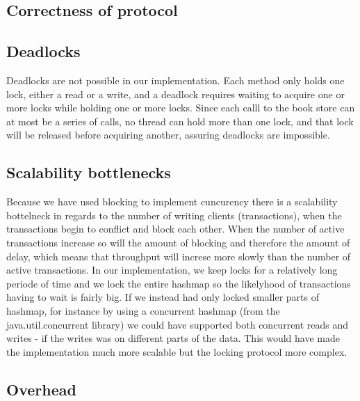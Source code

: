 \documentclass{article}
\theoremstyle{plain}
\theoremstyle{nonumberplain}
\begin{document}
\subsection{Correctness of protocol}



\subsection{Deadlocks}

Deadlocks are not possible in our implementation. Each method only holds one lock, either a read or a write, and a deadlock requires waiting to acquire one or more locks while holding one or more locks. Since each calll to the book store can at most be a series of calls, no thread can hold more than one lock, and that lock will be released before acquiring another, assuring deadlocks are impossible.

\subsection{Scalability bottlenecks}
Because we have used blocking to implement cuncurency there is a scalability bottelneck in regards to the number of writing clients (transactions), when the transactions begin to conflict and block each other. 
When the number of active transactions increase so will the amount of blocking and therefore the amount of delay, which means that throughput will increse more slowly than the number of active transactions. 
In our implementation, we keep locks for a relatively long periode of time and we lock the entire hashmap so the likelyhood of transactions having to wait is fairly big.
If we instead had only locked smaller parts of hashmap, for instance by using a concurrent hashmap (from the java.util.concurrent library) we could have supported both concurrent reads and writes - if the writes was on different parts of the data. This would have made the implementation much more scalable but the locking protocol more complex.

\subsection{Overhead}
\end{document}
